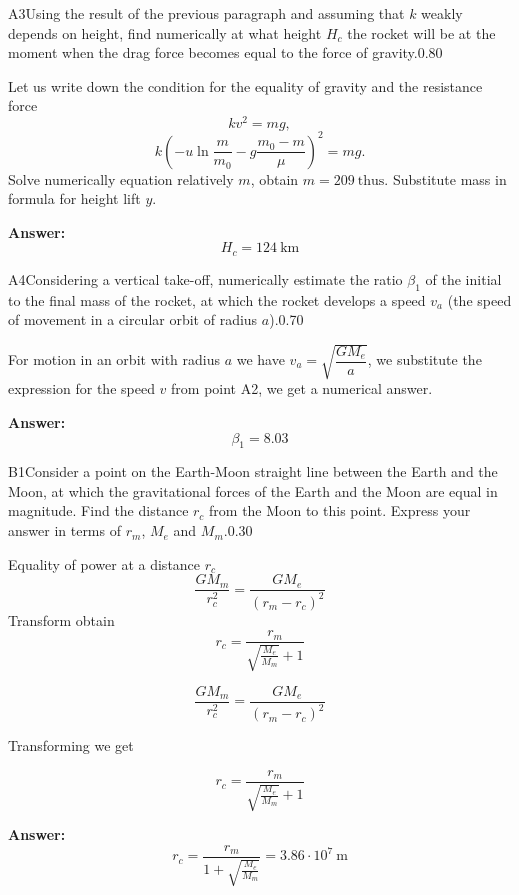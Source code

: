 \documentclass[11pt,a4paper]{article}
\begin{document}
\begin{solcard}{A3}{Using the result of the previous paragraph and assuming that $k$ weakly depends on height, find numerically at what height $H_c$ the rocket will be at the moment when the drag force becomes equal to the force of gravity.}{0.80}

Let us write down the condition for the equality of gravity and the resistance force $$kv^2=mg,$$$$k\left(-u\ln{\dfrac{m}{m_0}}-g\dfrac{m_0-m}{\mu}\right)^2=mg.$$Solve numerically equation relatively $m$, obtain $m=209~\text{thus}$. Substitute mass in formula for height lift $y$.

\par\smallskip\noindent\textbf{Answer:} $$H_c=124~\text{km}$$
\end{solcard}

\begin{solcard}{A4}{Considering a vertical take-off, numerically estimate the ratio $\beta_1$ of the initial to the final mass of the rocket, at which the rocket develops a speed $v_a$ (the speed of movement in a circular orbit of radius $a$).}{0.70}

For motion in an orbit with radius $a$ we have $v_a=\sqrt{\dfrac{GM_e}{a}}$, we substitute the expression for the speed $v$ from point A2, we get a numerical answer.

\par\smallskip\noindent\textbf{Answer:} $$\beta_1=8.03$$
\end{solcard}

\begin{solcard}{B1}{Consider a point on the Earth-Moon straight line between the Earth and the Moon, at which the gravitational forces of the Earth and the Moon are equal in magnitude. Find the distance $r_c$ from the Moon to this point. Express your answer in terms of $r_m$, $M_e$ and $M_m$.}{0.30}

Equality of power at a distance $r_c$ $$\dfrac{GM_m}{r_c^2} = \dfrac{GM_e}{(r_m - r_c)^2}$$ Transform obtain $$r_c = \dfrac{r_m}{\sqrt{\frac{M_e}{M_m}} + 1}$$


$$\dfrac{GM_m}{r_c^2} = \dfrac{GM_e}{(r_m - r_c)^2}$$


Transforming we get


$$r_c = \dfrac{r_m}{\sqrt{\frac{M_e}{M_m}} + 1}$$

\par\smallskip\noindent\textbf{Answer:} $$r_c = \dfrac{r_m}{1 + \sqrt{\frac{M_e}{M_m}}}=3.86\cdot10^7~\text{m}$$
\end{solcard}
\end{document}
